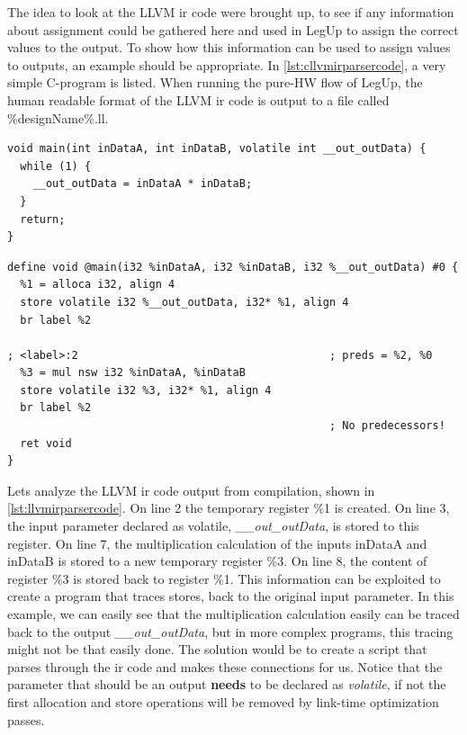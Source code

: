 The idea to look at the LLVM \gls{ir} code were brought up, to see if any information about assignment could be gathered here and used in LegUp to assign the correct values to the output. To show how this information can be used to assign values to outputs, an example should be appropriate. In \cref{lst:cllvmirparsercode}, a very simple C-program is listed. When running the pure-HW flow of LegUp, the human readable format of the LLVM \gls{ir} code is output to a file called \%designName\%.ll.
\lstset{language=C,style=Cstyle}
\begin{lstlisting}[caption={Simple C-code example for LLVM IR parsing},label=lst:cllvmirparsercode]
void main(int inDataA, int inDataB, volatile int __out_outData) {
  while (1) {
    __out_outData = inDataA * inDataB;
  }
  return;
}
\end{lstlisting}
\lstset{language=LLVM,style=LLVMStyle}
\begin{lstlisting}[caption={LLVM IR code for simple parsing example},label=lst:llvmirparsercode]
define void @main(i32 %inDataA, i32 %inDataB, i32 %__out_outData) #0 {
  %1 = alloca i32, align 4
  store volatile i32 %__out_outData, i32* %1, align 4
  br label %2

; <label>:2                                       ; preds = %2, %0
  %3 = mul nsw i32 %inDataA, %inDataB
  store volatile i32 %3, i32* %1, align 4
  br label %2
                                                  ; No predecessors!
  ret void
}
\end{lstlisting}
Lets analyze the LLVM \gls{ir} code output from compilation, shown in \cref{lst:llvmirparsercode}. On line 2 the temporary register \%1 is created. On line 3, the input parameter declared as volatile, \textit{\_\_out\_outData}, is stored to this register. On line 7, the multiplication calculation of the inputs inDataA and inDataB is stored to a new temporary register \%3. On line 8, the content of register \%3 is stored back to register \%1. This information can be exploited to create a program that traces stores, back to the original input parameter. In this example, we can easily see that the multiplication calculation easily can be traced back to the output \textit{\_\_out\_outData}, but in more complex programs, this tracing might not be that easily done. The solution would be to create a script that parses through the \gls{ir} code and makes these connections for us. Notice that the parameter that should be an output \textbf{needs} to be declared as \textit{volatile}, if not the first allocation and store operations will be removed by link-time optimization passes.

